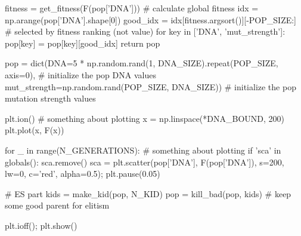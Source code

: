 \documentclass[12pt]{article}
\begin{document}
\begin{python}
    fitness = get_fitness(F(pop['DNA']))            # calculate global fitness
    idx = np.arange(pop['DNA'].shape[0])
    good_idx = idx[fitness.argsort()][-POP_SIZE:]   # selected by fitness ranking (not value)
    for key in ['DNA', 'mut_strength']:
        pop[key] = pop[key][good_idx]
    return pop


pop = dict(DNA=5 * np.random.rand(1, DNA_SIZE).repeat(POP_SIZE, axis=0),   # initialize the pop DNA values
           mut_strength=np.random.rand(POP_SIZE, DNA_SIZE))                # initialize the pop mutation strength values

plt.ion()       # something about plotting
x = np.linspace(*DNA_BOUND, 200)
plt.plot(x, F(x))

for _ in range(N_GENERATIONS):
    # something about plotting
    if 'sca' in globals(): sca.remove()
    sca = plt.scatter(pop['DNA'], F(pop['DNA']), s=200, lw=0, c='red', alpha=0.5); plt.pause(0.05)

    # ES part
    kids = make_kid(pop, N_KID)
    pop = kill_bad(pop, kids)   # keep some good parent for elitism

plt.ioff(); plt.show()

\end{python}
\end{document}

